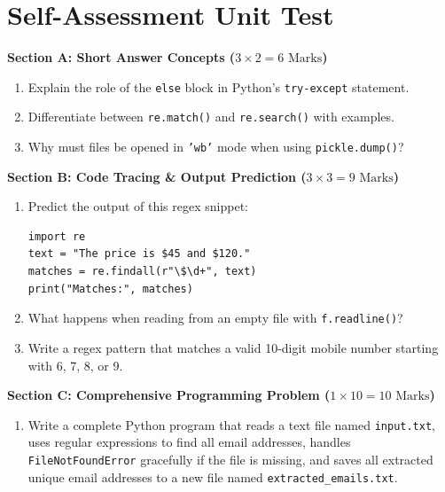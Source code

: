 \section{Self-Assessment Unit Test}

\begin{chaptertest}
\noindent\textbf{Section A: Short Answer Concepts ($3 \times 2 = 6\text{ Marks}$)}
\begin{enumerate}
    \item Explain the role of the \texttt{else} block in Python's \texttt{try-except} statement.
    \item Differentiate between \texttt{re.match()} and \texttt{re.search()} with examples.
    \item Why must files be opened in \texttt{'wb'} mode when using \texttt{pickle.dump()}?
\end{enumerate}

\medskip
\noindent\textbf{Section B: Code Tracing \& Output Prediction ($3 \times 3 = 9\text{ Marks}$)}
\begin{enumerate}[start=4]
    \item Predict the output of this regex snippet:
    \begin{lstlisting}[language=Python3]
import re
text = "The price is $45 and $120."
matches = re.findall(r"\$\d+", text)
print("Matches:", matches)
    \end{lstlisting}
    \item What happens when reading from an empty file with \texttt{f.readline()}?
    \item Write a regex pattern that matches a valid 10-digit mobile number starting with 6, 7, 8, or 9.
\end{enumerate}

\medskip
\noindent\textbf{Section C: Comprehensive Programming Problem ($1 \times 10 = 10\text{ Marks}$)}
\begin{enumerate}[start=7]
    \item Write a complete Python program that reads a text file named \texttt{input.txt}, uses regular expressions to find all email addresses, handles \texttt{FileNotFoundError} gracefully if the file is missing, and saves all extracted unique email addresses to a new file named \texttt{extracted\_emails.txt}.
\end{enumerate}
\end{chaptertest}

